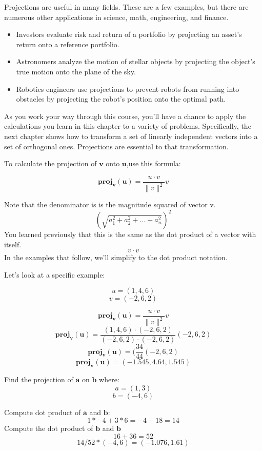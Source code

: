 Projections are useful in many fields. These are a few examples, but there are numerous other applications in science, math, engineering, and finance.

\begin{itemize}
\item Investors evaluate risk and return of a portfolio by projecting an asset’s return onto a reference portfolio.
\item Astronomers analyze the motion of stellar objects by projecting the object’s true motion onto the plane of the sky.
\item Robotics engineers use projections to prevent robots from running into obstacles by projecting the robot’s position onto the optimal path.
\end{itemize}

As you work your way through this course, you'll have a chance to apply the calculations you learn in this chapter to a variety of problems. Specifically, the next chapter shows how to transform a set of linearly independent vectors into a set of orthogonal ones. Projections are essential to that transformation. 

To calculate the projection of 
$\mathbf{v}$ onto $\mathbf{u}$,use this formula:

$$\mathbf{proj}_\mathbf{v}(\mathbf{u}) = \frac{u\cdot v}{\parallel{v}\parallel ^2}v$$

Note that the denominator is is the magnitude squared of vector v.
$$(\sqrt{a_1^2 + a_2^2 + ... + a_n^2} )^2$$
You learned previously that this is the same as the dot product of a vector with itself.
$${v\cdot v}$$
In the examples that follow, we'll simplify to the dot product notation.

Let's look at a specific example:

$$u = (1,4,6)$$ 
$$v = (-2,6,2)$$ 

$$\mathbf{proj}_\mathbf{v}(\mathbf{u}) = \frac{u\cdot v}{\parallel {v}\parallel ^2}v$$
$$\mathbf{proj}_\mathbf{v}(\mathbf{u}) = \frac{(1,4,6)\cdot(-2,6,2)}{ (-2,6,2)\cdot (-2,6,2)}(-2,6,2)$$
$$\mathbf{proj}_\mathbf{v}(\mathbf{u}) = (\frac{34}{44}(-2,6,2)$$
$$\mathbf{proj}_\mathbf{v}(\mathbf{u}) = (-1.545, 4.64, 1.545)$$

\begin{Exercise}[title={Projections}, label=projections]
	Find the projection of $\mathbf{a}$ on $\mathbf{b}$ where:
	$$a = (1,3)$$
	$$b = (-4,6)$$
\end{Exercise}
\begin{Answer}[ref=project_vector]
	Compute dot product of $\mathbf{a}$ and $\mathbf{b}$:
	$$1*-4 + 3*6 = -4 +18 = 14$$
	Compute the dot product of $\mathbf{b}$ and $\mathbf{b}$
	$$16 + 36 = 52 $$
	$$14/52 * (-4,6) = (-1.076 , 1.61)$$
\end{Answer}
 
